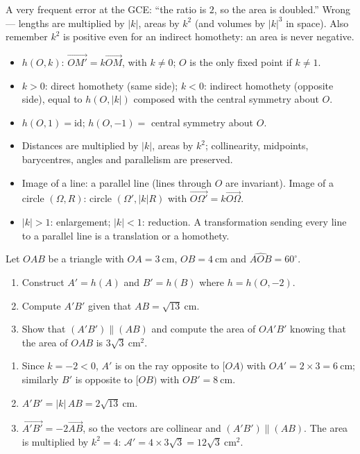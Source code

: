 \documentclass[11pt]{article}
\begin{document}
\begin{attention}
A very frequent error at the GCE: ``the ratio is $2$, so the area is doubled.'' Wrong — lengths are multiplied by $|k|$, areas by $k^{2}$ (and volumes by $|k|^{3}$ in space). Also remember $k^{2}$ is positive even for an indirect homothety: an area is never negative.
\end{attention}

\begin{aretenir}
\begin{itemize}
\item $h(O,k)$: $\vec{OM'} = k\vec{OM}$, with $k \neq 0$; $O$ is the only fixed point if $k \neq 1$.
\item $k > 0$: direct homothety (same side); $k < 0$: indirect homothety (opposite side), equal to $h(O,|k|)$ composed with the central symmetry about $O$.
\item $h(O,1) = \mathrm{id}$; $h(O,-1) = $ central symmetry about $O$.
\item Distances are multiplied by $|k|$, areas by $k^{2}$; collinearity, midpoints, barycentres, angles and parallelism are preserved.
\item Image of a line: a parallel line (lines through $O$ are invariant). Image of a circle $(\Omega, R)$: circle $(\Omega', |k|R)$ with $\vec{O\Omega'} = k\vec{O\Omega}$.
\item $|k| > 1$: enlargement; $|k| < 1$: reduction. A transformation sending every line to a parallel line is a translation or a homothety.
\end{itemize}
\end{aretenir}

\begin{exercice}
Let $OAB$ be a triangle with $OA = 3\ \mathrm{cm}$, $OB = 4\ \mathrm{cm}$ and $\widehat{AOB} = 60^{\circ}$.
\begin{enumerate}
\item Construct $A' = h(A)$ and $B' = h(B)$ where $h = h(O,-2)$.
\item Compute $A'B'$ given that $AB = \sqrt{13}\ \mathrm{cm}$.
\item Show that $(A'B') \parallel (AB)$ and compute the area of $OA'B'$ knowing that the area of $OAB$ is $3\sqrt{3}\ \mathrm{cm^{2}}$.
\end{enumerate}
\end{exercice}

\begin{corrige}[Exercise 1]
\begin{enumerate}
\item Since $k = -2 < 0$, $A'$ is on the ray opposite to $[OA)$ with $OA' = 2 \times 3 = 6\ \mathrm{cm}$; similarly $B'$ is opposite to $[OB)$ with $OB' = 8\ \mathrm{cm}$.
\item $A'B' = |k|\,AB = 2\sqrt{13}\ \mathrm{cm}$.
\item $\vec{A'B'} = -2\vec{AB}$, so the vectors are collinear and $(A'B') \parallel (AB)$. The area is multiplied by $k^{2} = 4$: $\mathcal{A}' = 4 \times 3\sqrt{3} = 12\sqrt{3}\ \mathrm{cm^{2}}$.
\end{enumerate}
\end{corrige}
\end{document}

